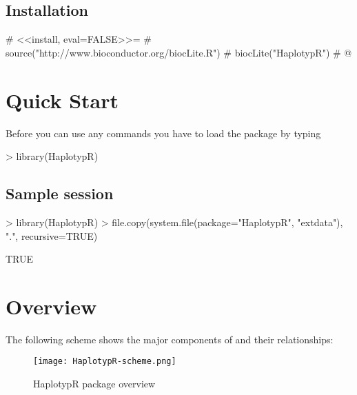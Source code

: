 \documentclass[12pt]{article}
\begin{document}
\subsection{Installation}
\label{sec:Installation}
# <<install, eval=FALSE>>=
# source("http://www.bioconductor.org/biocLite.R")
# biocLite("HaplotypR")
# @


\newpage
\section{Quick Start}


Before you can use any  commands you have to load the package by typing
\begin{Schunk}
\begin{Sinput}
> library(HaplotypR)
\end{Sinput}
\end{Schunk}

\subsection{Sample  session}
\label{sec:SampleSession}
\begin{Schunk}
\begin{Sinput}
> library(HaplotypR)
> file.copy(system.file(package="HaplotypR", "extdata"), ".", recursive=TRUE)
\end{Sinput}
\begin{Soutput}
[1] TRUE
\end{Soutput}
\end{Schunk}

 
\newpage
\section{ Overview}
The following scheme shows the major components of  and their relationships:
\begin{figure}[!h]
\begin{center}
\texttt{[image: HaplotypR-scheme.png]}
\caption{HaplotypR package overview}
\label{fig:HaplotypR-scheme}
\end{center}
\end{figure}
\end{document}
